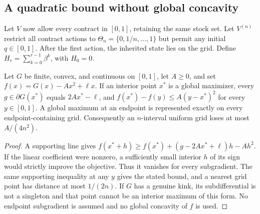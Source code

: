 \subsection{A quadratic bound without global concavity}\label{sec:grid}
Let $V$ now allow every contract in $[0,1]$, retaining the same stock set. Let $V^{(n)}$ restrict all contract actions to $\Theta_n=\{0,1/n,\ldots,1\}$ but permit any initial $q\in[0,1]$. After the first action, the inherited state lies on the grid. Define $H_r=\sum_{k=0}^{r-1}\beta^k$, with $H_0=0$.

\begin{lemma}\label{lem:semiconvex}
Let $G$ be finite, convex, and continuous on $[0,1]$, let $A\geq0$, and set $f(x)=G(x)-Ax^2+\ell x$. If an interior point $x^*$ is a global maximizer, every $g\in\partial G(x^*)$ equals $2Ax^*-\ell$, and
$f(x^*)-f(y)\leq A(y-x^*)^2$ for every $y\in[0,1]$.
A global maximum at an endpoint is represented exactly on every endpoint-containing grid. Consequently an $n$-interval uniform grid loses at most $A/(4n^2)$.
\end{lemma}
\begin{proof}
A supporting line gives
$f(x^*+h)\geq f(x^*)+(g-2Ax^*+\ell)h-Ah^2$.
If the linear coefficient were nonzero, a sufficiently small interior $h$ of its sign would strictly improve the objective. Thus it vanishes for every subgradient. The same supporting inequality at any $y$ gives the stated bound, and a nearest grid point has distance at most $1/(2n)$. If $G$ has a genuine kink, its subdifferential is not a singleton and that point cannot be an interior maximum of this form. No endpoint subgradient is assumed and no global concavity of $f$ is used.
\end{proof}

